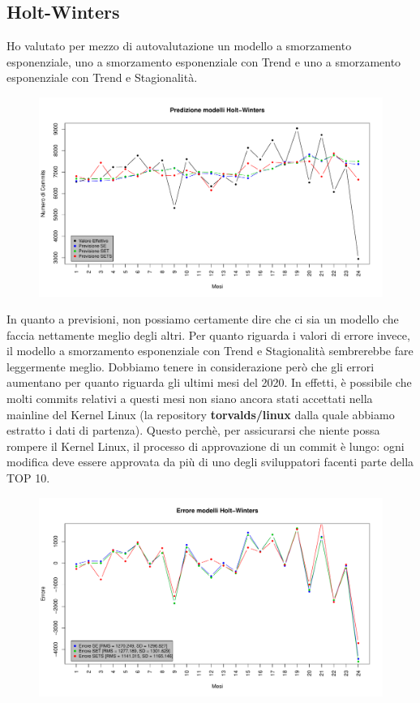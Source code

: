 \documentclass[11pt,a4paper]{article}
\begin{document}
\subsection{Holt-Winters}
Ho valutato per mezzo di autovalutazione un modello a smorzamento esponenziale,
uno a smorzamento esponenziale con Trend e uno a smorzamento esponenziale con
Trend e Stagionalit\`a.
\begin{figure}[H]
	\vspace{-0.4cm}
	\hspace{-1.5cm}
	\includegraphics[scale=0.66]{imgs/HW_predict.pdf}
\end{figure}
\vspace{-0.6cm}
\noindent
In quanto a previsioni, non possiamo certamente dire che ci sia un modello che
faccia nettamente meglio degli altri. Per quanto riguarda i valori di errore
invece, il modello a smorzamento esponenziale con Trend e Stagionalit\`a
sembrerebbe fare leggermente meglio. Dobbiamo tenere in considerazione per\`o
che gli errori aumentano per quanto riguarda gli ultimi mesi del 2020. In
effetti, \`e possibile che molti commits relativi a questi mesi non siano ancora
stati accettati nella mainline del Kernel Linux (la repository
\textbf{torvalds/linux} dalla quale abbiamo estratto i dati di partenza). Questo
perch\`e, per assicurarsi che niente possa rompere il Kernel Linux, il processo
di approvazione di un commit \`e lungo: ogni modifica deve essere approvata da
pi\`u di uno degli sviluppatori facenti parte della TOP 10.
\begin{figure}[H]
	\vspace{-1.5cm}
	\hspace{-1.5cm}
	\includegraphics[scale=0.66]{imgs/HW_residuals.pdf}
	\vspace{-1.2cm}
\end{figure}
\end{document}
